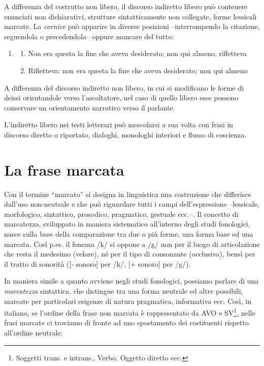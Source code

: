 \documentclass[
  a4paper,
  twoside,
  11pt,
  chapterprefix=false,
  bibliography=totocnumbered,
  listof=flat]{scrbook}
\providecommand{\tightlist}{%
  \setlength{\itemsep}{0pt}\setlength{\parskip}{0pt}}
\begin{document}
A differenza del costrutto non libero, il discorso indiretto libero può contenere enunciati non dichiarativi, strutture sintatticamente non collegate, forme lessicali marcate. La \emph{cornice} può apparire in diverse posizioni --interrompendo la citazione, seguendola o precedendola-- oppure mancare del tutto:

\begin{enumerate}
\def\labelenumi{(\arabic{enumi})}
\setcounter{enumi}{157}
\item
  \begin{enumerate}
  \def\labelenumii{\alph{enumii}.}
  \tightlist
  \item
    Non era questa la fine che aveva desiderato; non qui almeno, rifletteva
  \item
    Rifletteva: non era questa la fine che aveva desiderato; non qui almeno
  \end{enumerate}
\end{enumerate}

A differenza del discorso indiretto non libero, in cui si modificano le forme di deissi orientandole verso l'ascoltatore, nel caso di quello libero esse possono conservare un orientamento narrativo verso il parlante.

L'indiretto libero nei testi letterari può mescolarsi a sua volta con frasi in discorso diretto o riportato, dialoghi, monologhi interiori e flusso di coscienza.

\hypertarget{la-frase-marcata}{%
\chapter{La frase marcata}\label{la-frase-marcata}}

Con il termine \enquote{marcato} si designa in linguistica una costruzione che differisce dall'uso non-neutrale e che può riguardare tutti i campi dell'espressione --lessicale, morfologico, sintattico, prosodico, pragmatico, gestuale ecc.--. Il concetto di marcatezza, sviluppato in maniera sistematico all'interno degli studi fonologici, nasce sulla base della comparazione tra due o più forme, una forma base ed una marcata. Così p.es. il fonema /k/ si oppone a /g/ non per il luogo di articolazione che resta il medesimo (velare), né per il tipo di consonante (occlusiva), bensì per il tratto di sonorità ({[}- sonoro{]} per /k/, {[}+ sonoro{]} per /g/).

In maniera simile a quanto avviene negli studi fonologici, possiamo parlare di una \emph{marcatezza} sintattica, che distingue tra una forma neutrale ed altre possibili, marcate per particolari esigenze di natura pragmatica, informativa ecc. Così, in italiano, se l'ordine della frase non marcata è rappresentato da AVO e SV\footnote{Soggetti trans. e intrans., Verbo, Oggetto diretto ecc.}, nelle frasi marcate ci troviamo di fronte ad uno spostamento dei costituenti rispetto all'ordine neutrale:
\end{document}
